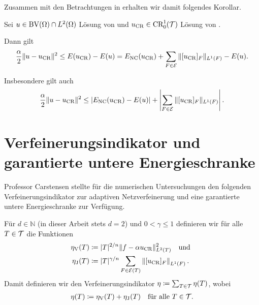 Zusammen mit den Betrachtungen in  
erhalten wir damit folgendes Korollar.

\begin{corollary}
  Sei $u\in\textup{BV}(\Omega)\cap L^2(\Omega)$ Lösung von
   und $u_\textup{CR}\in\textup{CR}^1_0(\mathcal{T})$ Lösung von
  .

  Dann gilt
  \begin{align*}
    \frac{\alpha}{2}\Vert u-u_\textup{CR}\Vert^2\leq
    E(u_\textup{CR})-E(u)=E_\textup{NC}(u_\textup{CR})+\sum_{F\in\mathcal{E}}\Vert[u_\textup{CR}]_F\Vert_{L^1(F)}-E(u).
  \end{align*}

  Insbesondere gilt auch 
  \begin{align*}
    \frac{\alpha}{2}\Vert u-u_\textup{CR}\Vert^2
    \leq
    \left|E_\textup{NC}(u_\textup{CR})-E(u)\right|+
    \left|\sum_{F\in\mathcal{E}}\Vert[u_\textup{CR}]_F\Vert_{L^1(F)}\right|.
  \end{align*}
\end{corollary}

\section{Verfeinerungsindikator und garantierte untere Energieschranke}

Professor Carstensen stellte für die numerischen Untersuchungen 
den folgenden Verfeinerungsindikator zur adaptiven Netzverfeinerung und eine 
garantierte untere Energieschranke zur Verfügung.

\begin{definition}[Verfeinerungsindikator]
  \label{def:refinementIndicator}
  Für $d\in\mathbb{N}$ (in dieser Arbeit stets $d=2$) und $0<\gamma\leq 1$
  definieren wir für alle $T\in\mathcal{T}$ die Funktionen
  \begin{align*}
    \eta_\text{V}(T)
    &\coloneqq
    |T|^{2/n}\Vert f-\alpha u_\textup{CR}\Vert^2_{L^2(T)}\quad\text{und }\\
    \eta_\text{J}(T)
    &\coloneqq
    |T|^{\gamma/n}\sum_{F\in\mathcal{E}(T)}\left\Vert [u_\textup{CR}]_F\right\Vert_{L^1(F)}.
  \end{align*} 
  Damit definieren wir den Verfeinerungsindikator
  $\eta\coloneqq\sum_{T\in\mathcal{T}}\eta(T)$, wobei
  \begin{align} \label{eq:refinementIndicator} 
    \eta (T)
    \coloneqq
    \eta_\text{V}(T) + \eta_\text{J}(T)\quad\text{für alle } T\in\mathcal{T}.
  \end{align} 
\end{definition}

